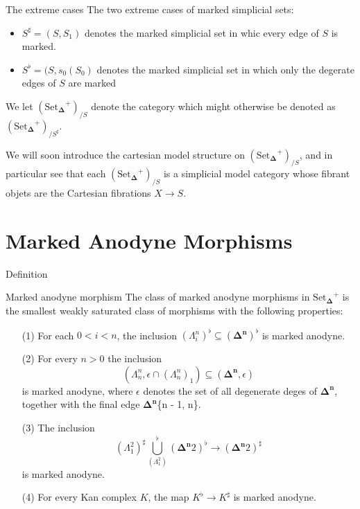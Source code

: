 \documentclass{beamer}[9pt]
\newcommand{\8}{\ensuremath{\infty}}
\newcommand{\Horn}[2]{\ensuremath{\Lambda^{#1}_{#2}}}
\newcommand{\Simplex}[1][n]{\ensuremath{\boldsymbol{\Delta^{#1}}}}
\newcommand{\SSet}{\ensuremath{\text{Set}_{\boldsymbol{\Delta}}}}
\begin{document}
\begin{frame}{The extreme cases}
  The two extreme cases of marked simplicial sets:
  \begin{itemize}
    \item $S^\sharp = (S, S_1)$ denotes the marked simplicial set in whic every edge of $S$ is marked.
          \pause
    \item $S^\flat = (S, s_0(S_0)$ denotes the marked simplicial set in which only the degerate edges of $S$ are marked
  \end{itemize}

  We let $(\SSet^+)_{/S}$ denote the category which might otherwise be denoted as $(\SSet^+)_{/S^\sharp}$.

  We will soon introduce the cartesian model structure on $(\SSet^+)_{/S}$, and in particular see that each $(\SSet^+)_{/S}$ is a simplicial model category whose fibrant objets are the Cartesian fibrations $X \rightarrow S$.
\end{frame}

\section{Marked Anodyne Morphisms}

\begin{frame}{Definition}
  \begin{definition}{Marked anodyne morphism}
    The class of marked anodyne morphisms in $\SSet^+$ is the smallest weakly saturated class of morphisms with the following properties:

    \begin{itemize}
      \item[(1)] For each $0 < i < n$, the inclusion $(\Horn{n}{i})^\flat \subseteq (\Simplex)^\flat$ is marked anodyne.
      \item[(2)] For every $n > 0$ the inclusion
            $$
              (\Horn{n}{n}, \epsilon \cap (\Horn{n}{n})_1) \subseteq (\Simplex, \epsilon)
            $$
            is marked anodyne, where $\epsilon$ denotes the set of all degenerate deges of \Simplex, together with the final edge \Simplex{\{n - 1, n\}}.
    \end{itemize}
  \end{definition}
\end{frame}

\begin{frame}
  \begin{itemize}
    \item[(3)] The inclusion
          $$
            (\Horn{2}{1})^\sharp \bigcup_(\Horn{2}{1})^\flat (\Simplex{2})^\flat \rightarrow (\Simplex{2})^\sharp
          $$
          is marked anodyne.
    \item[(4)] For every Kan complex $K$, the map $K^\flat \rightarrow K^\sharp$ is marked anodyne.
  \end{itemize}
\end{frame}
\end{document}
